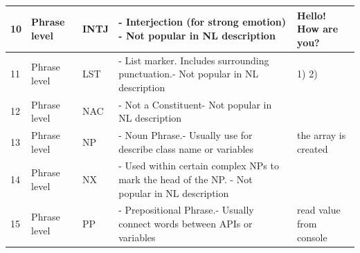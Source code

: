 \begin{longtable}{|p{}|p{}|p{}|p{}|p{}|}
		\rowcolor[HTML]{FFFFC7} 
		10                                                        & Phrase level                                                & INTJ                                                       & - Interjection (for strong emotion) - Not popular in NL description                                             & Hello! How are you?                                                             \\ \hline
		\rowcolor[HTML]{FFFFC7} 
		11                                                        & Phrase level                                                & LST                                                        & - List marker. Includes surrounding punctuation.- Not popular in NL description                                 & 1) 2)                                                                           \\ \hline
		\rowcolor[HTML]{FFFFC7} 
		12                                                        & Phrase level                                                & NAC                                                        & - Not a Constituent- Not popular in NL description                                                              &                                                                                 \\ \hline
		\rowcolor[HTML]{FFCCC9} 
		13                                                        & Phrase level                                                & NP                                                         & - Noun Phrase.- Usually use for describe class name or variables                                                & the array is created                                                            \\ \hline
		\rowcolor[HTML]{9AFF99} 
		14                                                        & Phrase level                                                & NX                                                         & - Used within certain complex NPs to mark the head of the NP. - Not popular in NL description                   &                                                                                 \\ \hline
		\rowcolor[HTML]{9AFF99} 
		15                                                        & Phrase level                                                & PP                                                         & - Prepositional Phrase.- Usually connect words between APIs or variables                                        & read value from console                                                         \\ \hline

\end{longtable}
